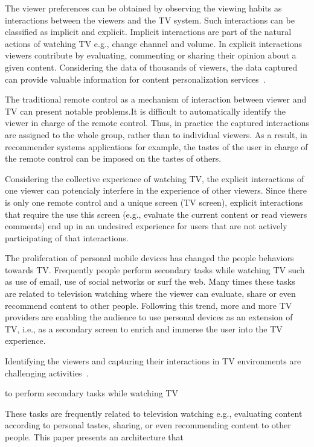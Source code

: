 \documentclass[conference,a4paper]{IEEEtran}
\begin{document}
The viewer preferences can be obtained by observing the viewing habits as interactions between the viewers and the TV system. Such interactions can be classified as implicit and explicit. Implicit interactions are part of the natural actions of watching TV e.g., change channel and volume. In explicit interactions viewers contribute by evaluating, commenting or sharing their opinion about a given content. Considering the data of thousands of viewers, the data captured can provide valuable information for content personalization services~\cite{Teixeira2010}.

The traditional remote control as a mechanism of interaction between viewer and TV can present notable problems.It is difficult to automatically identify the viewer in charge of the remote control. Thus, in practice the captured interactions are assigned to the whole group, rather than to individual viewers. As a result, in recommender systems applications for example, the tastes of the user in charge of the remote control can be imposed on the tastes of others.

Considering the collective experience of watching TV, the explicit interactions of one viewer can potencialy interfere in the experience of other viewers. Since there is only one remote control and a unique screen (TV screen), explicit interactions that require the use this screen (e.g., evaluate the current content or read viewers comments) end up in an undesired experience for users that are not actively participating of that interactions.

The proliferation of personal mobile devices has changed the people behaviors towards TV. Frequently people perform secondary tasks while watching TV such as use of email, use of social networks or surf the web. Many times these tasks are related to television watching where the viewer can evaluate, share or even recommend content to other people. Following this trend, more and more TV providers are enabling the audience to use personal devices as an extension of TV, i.e., as a secondary screen to enrich and immerse the user into the TV experience.

Identifying the viewers and capturing their interactions in TV environments are challenging activities~\cite{Hwang2007,Teixeira2010}. 

to perform secondary tasks while watching TV

These tasks are frequently related to television watching e.g., evaluating content according to personal tastes, sharing, or even recommending content to other people. This paper presents an architecture that 
\end{document}

